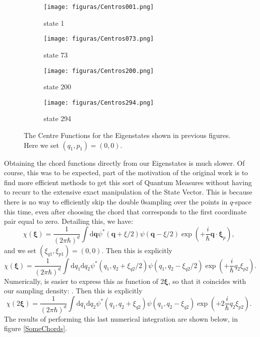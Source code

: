 \documentclass[a4paper,12pt]{article}
\newcommand{\ihb}{\frac{i}{\hbar}}
\newcommand{\qfase}{\mathbf{q}}
\newcommand{\xifase}{ {\boldsymbol{\xi}} }
\newcommand{\rd}{\!\mathrm{d}}
\begin{document}
\begin{figure}[h]
  \centering
  \begin{subfigure}[b]{0.98\textwidth}
    \texttt{[image: figuras/Centros001.png]}
    \caption{state 1}
    \label{fig:gull}
  \end{subfigure}%

  \begin{subfigure}[b]{0.98\textwidth}
    \texttt{[image: figuras/Centros073.png]}
    \caption{state 73}
    \label{fig:tiger}
  \end{subfigure}

  \begin{subfigure}[b]{0.98\textwidth}
    \texttt{[image: figuras/Centros200.png]}
    \caption{state 200}
    \label{fig:mouse}
  \end{subfigure}

  \begin{subfigure}[b]{0.98\textwidth}
    \texttt{[image: figuras/Centros294.png]}
    \caption{state 294}
    \label{fig:mouse}
  \end{subfigure}
  \caption{The Centre Functions for the Eigenstates shown in previous figures.
Here we set $(q_1, p_1)=(0,0)$.} 
  \label{exampleinterpol}
\end{figure}

Obtaining the chord functions directly from our Eigenstates is much slower.
Of course, this was to be expected, part of the motivation of the original
work is to find more efficient methods to get this sort of Quantum Measures
without having to recurr to the extensive exact manipulation of the
State Vector. This is because there is no way to efficiently skip the double
0sampling over the points in $q$-space this time, 
even after choosing the chord that corresponds
to the first coordinate pair equal to zero. Detailing this, we have:
\begin{equation}
  \chi(\xifase)=\frac{1}{(2\pi\hbar)^d}\int \rd \qfase \psi^*(\qfase 
  +\xi/2)\psi(\qfase-\xi/2)\exp(+\ihb \qfase \cdot \xifase_p),
\end{equation}
and we set $(\xi_{q1},\xi_{p1})=(0,0)$. Then this is explicitly
\begin{equation}
  \chi(\xifase)=\frac{1}{(2\pi\hbar)^d}\int \rd q_1 \rd q_2  \psi^*(q_1, q_2+ 
  \xi_{q2}/2)\psi(q_1, q_2-\xi_{q2}/2)\exp(+\ihb q_2  \xi_{p2}).
\end{equation}
Numerically, is easier to express this as function of $2 \xifase$, so that it
coincides with our sampling density:
. Then this is explicitly
\begin{equation}
  \chi( 2 \xifase)=\frac{1}{(2\pi\hbar)^d}\int \rd q_1 \rd q_2  \psi^*(q_1, q_2+ 
  \xi_{q2})\psi(q_1, q_2-\xi_{q2})\exp(+2\ihb q_2  \xi_{p2}).
\end{equation}
The results of performing this last numerical integration are shown below, in
figure \ref{SomeChords}.
\end{document}
